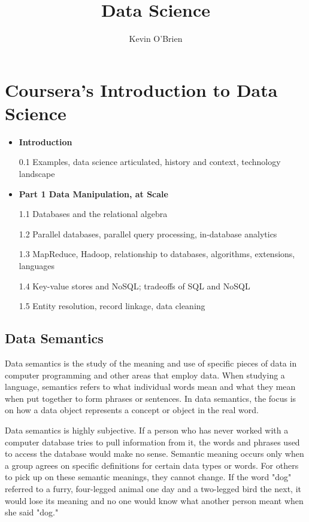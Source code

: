 \documentclass[12pt]{article}
\title{Data Science}
\author{Kevin O'Brien}
\begin{document}
\maketitle

\tableofcontents
\newpage
\section{Coursera's Introduction to Data Science}

\begin{itemize} 
\item \textbf{Introduction}
\item[0.1] Examples, data science articulated, history and context, technology landscape
\item \textbf{Part 1 Data Manipulation, at Scale}
\item[1.1] Databases and the relational algebra  
\item[1.2] Parallel databases, parallel query processing, in-database analytics \\
\item[1.3] MapReduce, Hadoop, relationship to databases, algorithms, extensions, languages  
\item[1.4] Key-value stores and NoSQL; tradeoffs of SQL and NoSQL
\item[1.5] Entity resolution, record linkage, data cleaning
\end{itemize}

\subsection{Data Semantics}
Data semantics is the study of the meaning and use of specific pieces of data in computer programming and other areas that employ data. When studying a language, semantics refers to what individual words mean and what they mean when put together to form phrases or sentences. In data semantics, the focus is on how a data object represents a concept or object in the real word.

Data semantics is highly subjective. If a person who has never worked with a computer database tries to pull information from it, the words and phrases used to access the database would make no sense. Semantic meaning occurs only when a group agrees on specific definitions for certain data types or words. For others to pick up on these semantic meanings, they cannot change. If the word "dog" referred to a furry, four-legged animal one day and a two-legged bird the next, it would lose its meaning and no one would know what another person meant when she said "dog."
\end{document}
